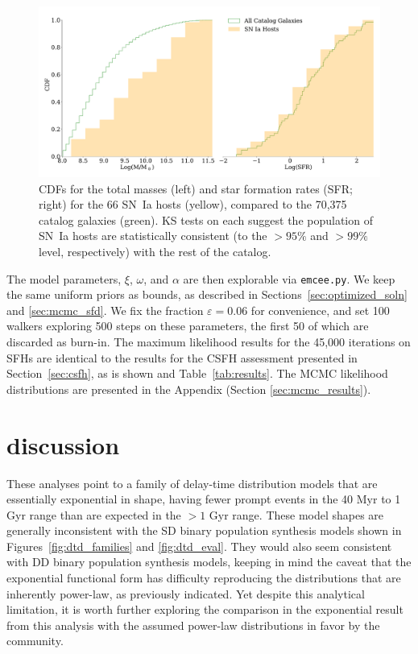 \documentclass[apj]{aastex62}
\begin{document}
\begin{figure}[t] %
   \centering
   \includegraphics[width=5.0in]{figure_cdfs} 
   \caption{\footnotesize CDFs for the total masses (left) and star formation rates (SFR; right) for the 66 SN~Ia hosts (yellow), compared to the 70,375 catalog galaxies (green). KS tests on each suggest the population of SN~Ia hosts are statistically consistent (to the $>95\%$ and $>99\%$ level, respectively) with the rest of the catalog.}
   \label{fig:figure_cdfs}
\end{figure}

The model parameters, $\xi$, $\omega$, and $\alpha$ are then explorable via {\tt emcee.py}. We keep the same uniform priors as bounds, as described in Sections~\ref{sec:optimized_soln} and \ref{sec:mcmc_sfd}. We fix the fraction $\varepsilon=0.06$ for convenience, and set 100 walkers exploring 500 steps on these parameters, the first 50 of which are discarded as burn-in. The maximum likelihood results for the 45,000 iterations on SFHs are identical to the results for the CSFH assessment presented in Section~\ref{sec:csfh}, as is shown and Table~\ref{tab:results}. The MCMC likelihood distributions are presented in the Appendix (Section \ref{sec:mcmc_results}).

\section{discussion}\label{sec:discussion}
These analyses point to a family of delay-time distribution models that are essentially exponential in shape, having fewer prompt events in the 40 Myr to 1 Gyr range than are expected in the $>1$ Gyr range. These model shapes are generally inconsistent with the SD binary population synthesis models shown in Figures~\ref{fig:dtd_families} and \ref{fig:dtd_eval}. They would also seem consistent with DD binary population synthesis models, keeping in mind the caveat that the exponential functional form has difficulty reproducing the distributions that are inherently power-law, as previously indicated. Yet despite this analytical limitation, it is worth further exploring the comparison in the exponential result from this analysis with the assumed power-law distributions in favor by the community.
\end{document}
